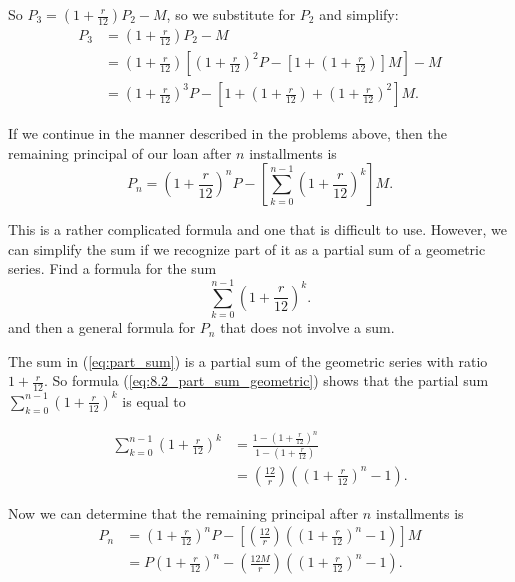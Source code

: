 \begin{exercises}
\begin{exerciseSolution}
So $P_3 = \left(1 + \frac{r}{12}\right)P_2 - M$, so we substitute for $P_2$ and simplify:
\begin{align*}
P_3 &= \left(1 + \frac{r}{12}\right)P_2 - M \\
	&=  \left(1 + \frac{r}{12}\right)\left[\left(1 + \frac{r}{12}\right)^2P - \left[1 + \left(1+\frac{r}{12}\right)\right] M\right] - M\\
	&= \left(1 + \frac{r}{12}\right)^3P - \left[1 + \left(1+\frac{r}{12}\right) + \left(1+\frac{r}{12}\right)^2 \right] M.
\end{align*}

\vs
\end{exerciseSolution}

    \item If we continue in the manner described in the problems above, then the remaining principal of our loan after $n$ installments is
\begin{equation} \label{eq:loan_1}
P_n = \left(1 + \frac{r}{12}\right)^nP - \left[\displaystyle \sum_{k=0}^{n-1} \left(1+\frac{r}{12}\right)^k \right] M.
\end{equation}

This is a rather complicated formula and one that is difficult to use. However, we can simplify the sum if we recognize part of  it as a partial sum of a geometric series. Find a formula for the sum
\begin{equation} \label{eq:part_sum}
\displaystyle \sum_{k=0}^{n-1} \left(1+\frac{r}{12}\right)^k.
\end{equation}
and then a general formula for $P_n$ that does not involve a sum.

\begin{exerciseSolution}

The sum in (\ref{eq:part_sum}) is a partial sum of the geometric series with ratio $1+\frac{r}{12}$. So formula (\ref{eq:8.2_part_sum_geometric}) shows that the partial sum $\displaystyle \sum_{k=0}^{n-1} \left(1+\frac{r}{12}\right)^k$ is equal to

\begin{align*}
\displaystyle \sum_{k=0}^{n-1} \left(1+\frac{r}{12}\right)^k &= \frac{1-\left(1+\frac{r}{12}\right)^n}{1-\left(1+\frac{r}{12}\right)} \\
	&= \left(\frac{12}{r}\right) \left(\left(1+\frac{r}{12}\right)^n - 1\right).
\end{align*}

Now we can determine that the remaining principal after $n$ installments is
\begin{align*}
P_n &= \left(1 + \frac{r}{12}\right)^nP - \left[\left(\frac{12}{r}\right) \left(\left(1+\frac{r}{12}\right)^n - 1\right) \right] M \\
	&= P \left(1+\frac{r}{12}\right)^n - \left(\frac{12M}{r}\right) \left( \left(1+\frac{r}{12}\right)^n - 1\right).
\end{align*}


\end{exerciseSolution}
\end{exercises}
